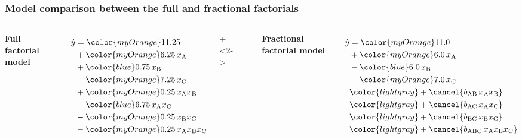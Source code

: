 \begin{frame}\frametitle{Model comparison between the full and fractional factorials}
	\begin{columns}[T]
			\begin{center}\textbf{Full factorial model}\end{center}
			
				
				\begin{align*}
					\hat{y} &= {\color{myOrange}11.25}\\
							&+ {\color{myOrange}6.25\,}x_\text{A}\\
							&+ {\color{blue}0.75\,}x_\text{B}\\
							&- {\color{myOrange}7.25\,}x_\text{C}\\
							&+ {\color{myOrange}0.25\,}x_\text{A}x_\text{B}\\
							&- {\color{blue}6.75\,}x_\text{A}x_\text{C}\\
							&- {\color{myOrange}0.25\,}x_\text{B}x_\text{C}\\
							&- {\color{myOrange}0.25\,}x_\text{A}x_\text{B}x_\text{C}		
				\end{align*}
			
		\onslide+<2->	{
			\rule[3mm]{0.03cm}{65mm}
			\begin{center}\textbf{Fractional factorial model}\end{center}
				
				\begin{align*}
					\hat{y} &= {\color{myOrange}11.0}\\
							&+ {\color{myOrange}6.0\,}x_\text{A}\\
							&- {\color{blue}6.0\,}x_\text{B}\\
							&- {\color{myOrange}7.0\,}x_\text{C}\\
							& \color{lightgray}+ \cancel{b_\text{AB}\,x_\text{A}x_\text{B}}\\
							& \color{lightgray}+ \cancel{b_\text{AC}\,x_\text{A}x_\text{C}}\\
							& \color{lightgray}+ \cancel{b_\text{BC}\,x_\text{B}x_\text{C}}\\
							& \color{lightgray}+ \cancel{b_\text{ABC}\,x_\text{A}x_\text{B}x_\text{C}}\\
				\end{align*}
				}
	\end{columns}
\end{frame}

